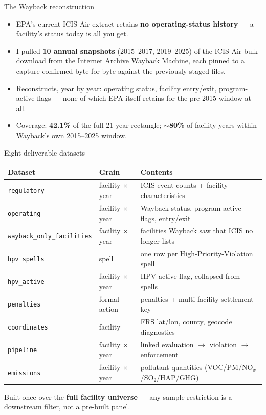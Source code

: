 \documentclass[aspectratio=169,11pt]{beamer}
\begin{document}
\begin{frame}{The Wayback reconstruction}
  \begin{itemize}
    \item EPA's current ICIS-Air extract retains \textbf{no operating-status history} — a facility's status
      today is all you get.
    \item I pulled \textbf{10 annual snapshots} (2015--2017, 2019--2025) of the ICIS-Air bulk download from
      the Internet Archive Wayback Machine, each pinned to a capture confirmed byte-for-byte against the
      previously staged files.
    \item Reconstructs, year by year: operating status, facility entry/exit, program-active flags — none of
      which EPA itself retains for the pre-2015 window at all.
    \item Coverage: \textbf{42.1\%} of the full 21-year rectangle; \textbf{$\sim$80\%} of facility-years
      within Wayback's own 2015--2025 window.
  \end{itemize}
\end{frame}

\begin{frame}{Eight deliverable datasets}
  \footnotesize
  \begin{tabular}{@{}l l l@{}}
    \toprule
    \textbf{Dataset} & \textbf{Grain} & \textbf{Contents} \\
    \midrule
    \texttt{regulatory} & facility $\times$ year & ICIS event counts + facility characteristics \\
    \texttt{operating} & facility $\times$ year & Wayback status, program-active flags, entry/exit \\
    \texttt{wayback\_only\_facilities} & facility $\times$ year & facilities Wayback saw that ICIS no longer lists \\
    \texttt{hpv\_spells} & spell & one row per High-Priority-Violation spell \\
    \texttt{hpv\_active} & facility $\times$ year & HPV-active flag, collapsed from spells \\
    \texttt{penalties} & formal action & penalties + multi-facility settlement key \\
    \texttt{coordinates} & facility & FRS lat/lon, county, geocode diagnostics \\
    \texttt{pipeline} & facility $\times$ year & linked evaluation $\to$ violation $\to$ enforcement \\
    \texttt{emissions} & facility $\times$ year & pollutant quantities (VOC/PM/NO$_x$/SO$_2$/HAP/GHG) \\
    \bottomrule
  \end{tabular}
  \vspace{0.6em}
  \small Built once over the \textbf{full facility universe} — any sample restriction is a downstream
  filter, not a pre-built panel.
\end{frame}
\end{document}
